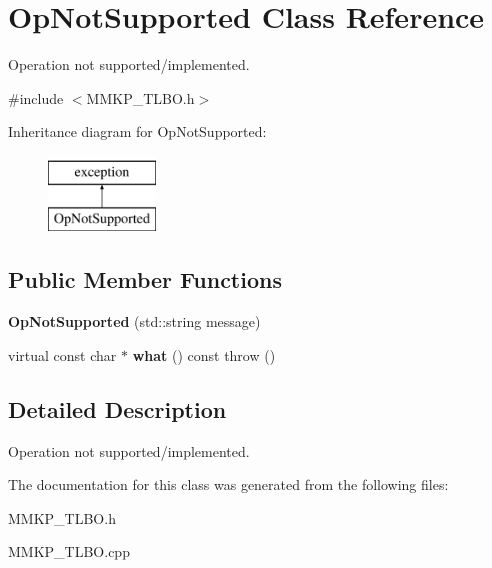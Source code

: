 \hypertarget{class_op_not_supported}{\section{Op\+Not\+Supported Class Reference}
\label{class_op_not_supported}
}


Operation not supported/implemented.  




{\ttfamily \#include $<$M\+M\+K\+P\+\_\+\+T\+L\+B\+O.\+h$>$}

Inheritance diagram for Op\+Not\+Supported\+:\begin{figure}[H]
\begin{center}
\leavevmode
\includegraphics[height=2.000000cm]{class_op_not_supported}
\end{center}
\end{figure}
\subsection*{Public Member Functions}
\begin{DoxyCompactItemize}
\item 
\hypertarget{class_op_not_supported_ae538c9ab4dfbb4f82db960de61cb7458}{{\bfseries Op\+Not\+Supported} (std\+::string message)}\label{class_op_not_supported_ae538c9ab4dfbb4f82db960de61cb7458}

\item 
\hypertarget{class_op_not_supported_a2fea1b12d8fee8e97ee2c428cd62d7e0}{virtual const char $\ast$ {\bfseries what} () const   throw ()}\label{class_op_not_supported_a2fea1b12d8fee8e97ee2c428cd62d7e0}

\end{DoxyCompactItemize}


\subsection{Detailed Description}
Operation not supported/implemented. 

The documentation for this class was generated from the following files\+:\begin{DoxyCompactItemize}
\item 
M\+M\+K\+P\+\_\+\+T\+L\+B\+O.\+h\item 
M\+M\+K\+P\+\_\+\+T\+L\+B\+O.\+cpp\end{DoxyCompactItemize}
